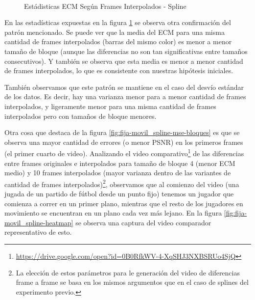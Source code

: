 \begin{figure}[H]
    \centering
    \\
    \caption{Est\'adisticas ECM Seg\'un Frames Interpolados - Spline}
    \label{fig:fija-movil_spline-mse_estadisticas}
\end{figure}

\par En las estad\'isticas expuestas en la figura
\ref{fig:fija-movil_spline-mse_estadisticas} se observa otra confirmaci\'on del
patr\'on mencionado. Se puede ver que la media del ECM para una misma cantidad
de frames interpolados (barras del mismo color) es menor a menor tama\~no de
bloque (aunque las diferencias no son tan significativas entre tama\~nos
consecutivos). Y tambi\'en se observa que esta media es menor a menor cantidad
de frames interpolados, lo que es consistente con nuestras hip\'otesis
iniciales.

\par Tambi\'en observamos que este patr\'on se mantiene en el caso del desv\'io
est\'andar de los datos. Es decir, hay una varianza menor para a menor cantidad
de frames interpolados, y ligeramente menor para una misma cantidad de frames
interpolados pero con tama\~nos de bloque menores.

\par Otra cosa que destaca de la figura \ref{fig:fija-movil_spline-mse-bloques}
es que se observa una mayor cantidad de errores (o menor PSNR) en los primeros
frames (el primer cuarto de video). Analizando el video
comparativo\footnote{\url{https://drive.google.com/open?id=0B0RfkWV-4-XqSHJ3NXBSRUo4SjQ}}
de las diferencias entre frames originales e interpolados para tama\~no de
bloque 4 (menor ECM medio) y 10 frames interpolados (mayor varianza dentro de
las variantes de cantidad de frames interpolados)\footnote{La elecci\'on de
estos par\'ametros para le generaci\'on del video de diferencias frame a frame
se basa en los mismos argumentos que en el caso de splines del experimento
previo.}, observamos que al comienzo del video (una jugada de un partido de
f\'utbol desde un punto fijo) tenemos un jugador que comienza a correr en un
primer plano, mientras que el resto de los jugadores en movimiento se
encuentran en un plano cada vez m\'as lejano. En la figura
\ref{fig:fija-movil_spline-heatmap} se observa una captura del video comparador
representativo de esto.

